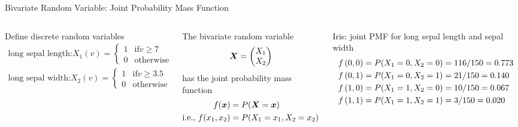 \begin{frame}{Bivariate Random Variable: Joint Probability Mass
  Function}
  \small
  \begin{columns}
  Define discrete random variables 
  \begin{align*}
	\text{long sepal length:} X_1(v) = 
  \begin{cases}
	1 & \text{if} v \ge 7\\
	0 & \text{otherwise}
  \end{cases}\\ 
  \text{long sepal width:} X_2(v) = 
  \begin{cases}
	1 & \text{if} v \ge 3.5\\
	0 & \text{otherwise}
  \end{cases}
  \end{align*}
  
  \smallskip
  The bivariate random variable
  $${\boldsymbol X} = \begin{pmatrix} X_1\\ X_2 \end{pmatrix}$$
  has the joint probability mass function
\begin{align*}
    f({\boldsymbol x}) & = P({\boldsymbol X} = {\boldsymbol x})\\
	\text{i.e., } f(x_1,x_2) & = P(X_1=x_1, X_2=x_2)
\end{align*}
  
    \centering
	\small
	Iris: joint PMF for long sepal length and sepal width
	    \begin{align*}
		  \tiny
        f\left(0, 0\right) & = P(X_1=0, X_2=0) = {116/150} = 0.773\\
        f\left(0, 1\right) & = P(X_1=0, X_2=1) = {21/150} = 0.140\\
        f\left(1, 0\right) & = P(X_1=1, X_2=0) = {10/150} = 0.067\\
        f\left(1, 1\right) & = P(X_1=1, X_2=1) = {3/150} = 0.020
    \end{align*}
  \end{columns}
\end{frame}


